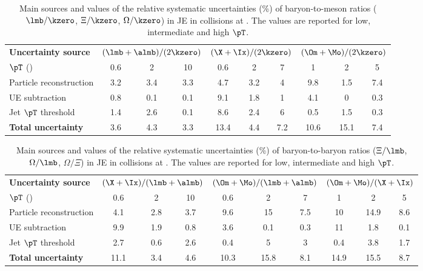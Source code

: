 \documentclass[ALICE,manyauthors]{cernphprep}
\begin{document}
\begin{table}[!ht]
	\begin{center}
		\caption{Main sources and values of the relative systematic uncertainties (\%) of baryon-to-meson ratios ($\lmb/\kzero$, $\Xi/\kzero$, $\Omega/\kzero$) in JE in \pPb collisions at \fivenn.
			The values are reported for low, intermediate and high $\pT$.}
		\label{tab:pPbBMRatioUncer}
		\begin{tabularx}{\textwidth}{@{} lCCCCCCCCC @{}}
			\toprule
			\textbf{Uncertainty source} & 
			& 
			&  \\
			\cmidrule(lr){2-4} \cmidrule(lr){5-7} \cmidrule(lr){8-10}
			$\pT$ (\GeVc) & 0.6 & 2 &10  & 0.6 & 2 & 7 & 1 & 2 & 5 \\
			\midrule
			Particle reconstruction& 3.2& 3.4& 3.3& 4.7& 3.2& 4& 9.8& 1.5& 7.4\\
			UE subtraction& 0.8& 0.1& 0.1& 9.1& 1.8& 1& 4.1& 0& 0.3\\
			Jet $\pT$ threshold& 1.4& 2.6& 0.1& 8.6& 2.4& 6& 0.5& 1.5& 0.3\\
			\midrule
			\textbf{Total uncertainty}& 3.6& 4.3& 3.3& 13.4& 4.4& 7.2& 10.6& 15.1& 7.4\\
			\bottomrule
		\end{tabularx}
	\end{center}
\end{table}
\begin{table}[!ht]
	\begin{center}
		\caption{Main sources and values of the relative systematic uncertainties (\%) of baryon-to-baryon ratios ($\Xi/\lmb$, $\Omega/\lmb$, $\Omega/\Xi$) in JE in \pPb collisions at \fivenn.
			The values are reported for low, intermediate and high $\pT$.}
		\label{tab:pPbBBRatioUncer}
		\begin{tabularx}{\textwidth}{@{} lCCCCCCCCC @{}}
			\toprule
			\textbf{Uncertainty source} & 
			& 
			&  \\
			\cmidrule(lr){2-4} \cmidrule(lr){5-7} \cmidrule(lr){8-10}
			$\pT$ (\GeVc) & 0.6 & 2 &10  & 0.6 & 2 & 7 & 1 & 2 & 5 \\
			\midrule
			Particle reconstruction& 4.1& 2.8& 3.7& 9.6& 15& 7.5& 10& 14.9& 8.6\\
			UE subtraction& 9.9& 1.9& 0.8& 3.6& 0.1& 0.3& 11& 1.8& 0.1\\
			Jet $\pT$ threshold& 2.7& 0.6& 2.6& 0.4& 5& 3& 0.4& 3.8& 1.7\\
			\midrule
			\textbf{Total uncertainty}& 11.1& 3.4& 4.6& 10.3& 15.8& 8.1& 14.9& 15.5& 8.7\\
			\bottomrule
		\end{tabularx}
	\end{center}
\end{table}
\end{document}
